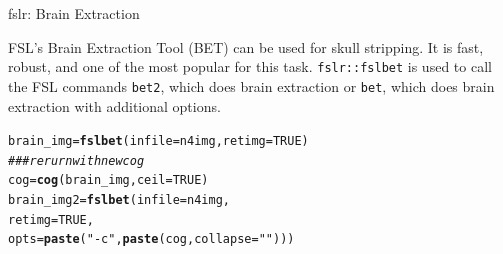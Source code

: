 \documentclass[11pt]{beamer}\usepackage[]{graphicx}\usepackage[]{color}
\makeatletter
\newcommand{\hlnum}[1]{\textcolor[rgb]{0.686,0.059,0.569}{#1}}%
\newcommand{\hlstr}[1]{\textcolor[rgb]{0.192,0.494,0.8}{#1}}%
\newcommand{\hlcom}[1]{\textcolor[rgb]{0.678,0.584,0.686}{\textit{#1}}}%
\newcommand{\hlstd}[1]{\textcolor[rgb]{0.345,0.345,0.345}{#1}}%
\newcommand{\hlkwb}[1]{\textcolor[rgb]{0.69,0.353,0.396}{#1}}%
\newcommand{\hlkwc}[1]{\textcolor[rgb]{0.333,0.667,0.333}{#1}}%
\newcommand{\hlkwd}[1]{\textcolor[rgb]{0.737,0.353,0.396}{\textbf{#1}}}%
\newenvironment{kframe}{%
 \def\at@end@of@kframe{}%
 \ifinner\ifhmode%
  \def\at@end@of@kframe{\end{minipage}}%
  \begin{minipage}{\columnwidth}%
 \fi\fi%
 \def\FrameCommand##1{\hskip\@totalleftmargin \hskip-\fboxsep
 \colorbox{shadecolor}{##1}\hskip-\fboxsep
     \hskip-\linewidth \hskip-\@totalleftmargin \hskip\columnwidth}%
 \MakeFramed {\advance\hsize-\width
   \@totalleftmargin\z@ \linewidth\hsize
   \@setminipage}}%
 {\par\unskip\endMakeFramed%
 \at@end@of@kframe}
\newenvironment{knitrout}{}{} %
\makeatother
\begin{document}
\begin{frame}[fragile]{fslr: Brain Extraction}

FSL's Brain Extraction Tool (BET) can be used for skull stripping.  It is fast, robust, and one of the most popular for this task.  \verb|fslr::fslbet| is used to call the FSL commands \verb|bet2|, which does brain extraction or \verb|bet|, which does brain extraction with additional options.



\begin{knitrout}
\color{fgcolor}\begin{kframe}
\begin{alltt}
\hlstd{brain_img} \hlkwb{=} \hlkwd{fslbet}\hlstd{(}\hlkwc{infile}\hlstd{=n4img,} \hlkwc{retimg}\hlstd{=}\hlnum{TRUE}\hlstd{)}
\hlcom{### rerurn with new cog}
\hlstd{cog} \hlkwb{=} \hlkwd{cog}\hlstd{(brain_img,} \hlkwc{ceil}\hlstd{=}\hlnum{TRUE}\hlstd{)}
\hlstd{brain_img2} \hlkwb{=} \hlkwd{fslbet}\hlstd{(}\hlkwc{infile}\hlstd{=n4img,}
                    \hlkwc{retimg}\hlstd{=}\hlnum{TRUE}\hlstd{,}
                    \hlkwc{opts} \hlstd{=} \hlkwd{paste}\hlstd{(}\hlstr{"-c"}\hlstd{,} \hlkwd{paste}\hlstd{(cog,} \hlkwc{collapse}\hlstd{=} \hlstr{" "}\hlstd{)))}
\end{alltt}
\end{kframe}
\end{knitrout}
\end{frame}
\end{document}
